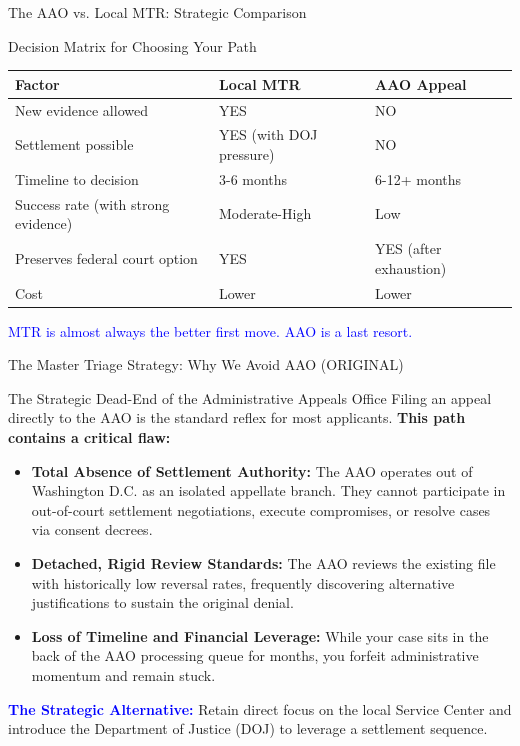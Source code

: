 \documentclass[11pt]{beamer}
\begin{document}
	\begin{frame}{The AAO vs. Local MTR: Strategic Comparison}
		\scriptsize
		\begin{block}{Decision Matrix for Choosing Your Path}
			\centering
			\begin{tabular}{|p{4cm}|p{3cm}|p{3cm}|}
				\hline
				\textbf{Factor} & \textbf{Local MTR} & \textbf{AAO Appeal} \\
				\hline
				New evidence allowed & YES & NO \\
				\hline
				Settlement possible & YES (with DOJ pressure) & NO \\
				\hline
				Timeline to decision & 3-6 months & 6-12+ months \\
				\hline
				Success rate (with strong evidence) & Moderate-High & Low \\
				\hline
				Preserves federal court option & YES & YES (after exhaustion) \\
				\hline
				Cost & Lower & Lower \\
				\hline
			\end{tabular}
			\vspace{0.2cm}
			\textcolor{blue}{MTR is almost always the better first move. AAO is a last resort.}
		\end{block}
	\end{frame}
	
	
	\begin{frame}{The Master Triage Strategy: Why We Avoid AAO (ORIGINAL)}
		\scriptsize
		\begin{block}{The Strategic Dead-End of the Administrative Appeals Office}
			Filing an appeal directly to the AAO is the standard reflex for most applicants. \textbf{This path contains a critical flaw:}
			\begin{itemize}
				\item \textbf{Total Absence of Settlement Authority:} The AAO operates out of Washington D.C. as an isolated appellate branch. They cannot participate in out-of-court settlement negotiations, execute compromises, or resolve cases via consent decrees.
				\item \textbf{Detached, Rigid Review Standards:} The AAO reviews the existing file with historically low reversal rates, frequently discovering alternative justifications to sustain the original denial.
				\item \textbf{Loss of Timeline and Financial Leverage:} While your case sits in the back of the AAO processing queue for months, you forfeit administrative momentum and remain stuck.
			\end{itemize}
			\textcolor{blue}{\textbf{The Strategic Alternative:}} Retain direct focus on the local Service Center and introduce the Department of Justice (DOJ) to leverage a settlement sequence.
		\end{block}
	\end{frame}
	
\end{document}

